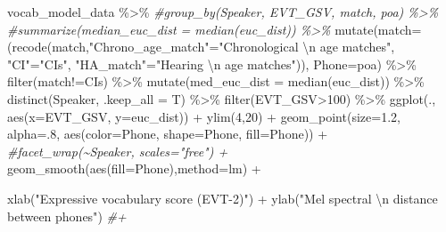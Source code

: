 \documentclass[
]{article}
\newenvironment{Shaded}{\begin{snugshade}}{\end{snugshade}}
\newcommand{\AttributeTok}[1]{\textcolor[rgb]{0.77,0.63,0.00}{#1}}
\newcommand{\CommentTok}[1]{\textcolor[rgb]{0.56,0.35,0.01}{\textit{#1}}}
\newcommand{\DecValTok}[1]{\textcolor[rgb]{0.00,0.00,0.81}{#1}}
\newcommand{\FloatTok}[1]{\textcolor[rgb]{0.00,0.00,0.81}{#1}}
\newcommand{\FunctionTok}[1]{\textcolor[rgb]{0.00,0.00,0.00}{#1}}
\newcommand{\NormalTok}[1]{#1}
\newcommand{\OtherTok}[1]{\textcolor[rgb]{0.56,0.35,0.01}{#1}}
\newcommand{\SpecialCharTok}[1]{\textcolor[rgb]{0.00,0.00,0.00}{#1}}
\newcommand{\StringTok}[1]{\textcolor[rgb]{0.31,0.60,0.02}{#1}}
\begin{document}
\begin{Shaded}
\begin{Highlighting}[]
\NormalTok{vocab\_model\_data }\SpecialCharTok{\%\textgreater{}\%}
  \CommentTok{\#group\_by(Speaker, EVT\_GSV, match, poa) \%\textgreater{}\%}
  \CommentTok{\#summarize(median\_euc\_dist = median(euc\_dist)) \%\textgreater{}\%}
  \FunctionTok{mutate}\NormalTok{(}\AttributeTok{match=}\NormalTok{(}\FunctionTok{recode}\NormalTok{(match,}\StringTok{"Chrono\_age\_match"}\OtherTok{=}\StringTok{"Chronological }\SpecialCharTok{\textbackslash{}n}\StringTok{ age matches"}\NormalTok{,}
                      \StringTok{"CI"}\OtherTok{=}\StringTok{"CIs"}\NormalTok{, }\StringTok{"HA\_match"}\OtherTok{=}\StringTok{"Hearing }\SpecialCharTok{\textbackslash{}n}\StringTok{ age matches"}\NormalTok{)),}
         \AttributeTok{Phone=}\NormalTok{poa) }\SpecialCharTok{\%\textgreater{}\%}
  \FunctionTok{filter}\NormalTok{(match}\SpecialCharTok{!=}\StringTok{\textquotesingle{}CIs\textquotesingle{}}\NormalTok{) }\SpecialCharTok{\%\textgreater{}\%}
  \FunctionTok{mutate}\NormalTok{(}\AttributeTok{med\_euc\_dist =} \FunctionTok{median}\NormalTok{(euc\_dist)) }\SpecialCharTok{\%\textgreater{}\%}
  \FunctionTok{distinct}\NormalTok{(Speaker, }\AttributeTok{.keep\_all =}\NormalTok{ T) }\SpecialCharTok{\%\textgreater{}\%}
  \FunctionTok{filter}\NormalTok{(EVT\_GSV}\SpecialCharTok{\textgreater{}}\DecValTok{100}\NormalTok{) }\SpecialCharTok{\%\textgreater{}\%}
  \FunctionTok{ggplot}\NormalTok{(., }\FunctionTok{aes}\NormalTok{(}\AttributeTok{x=}\NormalTok{EVT\_GSV, }\AttributeTok{y=}\NormalTok{euc\_dist)) }\SpecialCharTok{+} 
  \FunctionTok{ylim}\NormalTok{(}\DecValTok{4}\NormalTok{,}\DecValTok{20}\NormalTok{) }\SpecialCharTok{+}
  \FunctionTok{geom\_point}\NormalTok{(}\AttributeTok{size=}\FloatTok{1.2}\NormalTok{, }\AttributeTok{alpha=}\NormalTok{.}\DecValTok{8}\NormalTok{, }\FunctionTok{aes}\NormalTok{(}\AttributeTok{color=}\NormalTok{Phone, }\AttributeTok{shape=}\NormalTok{Phone, }\AttributeTok{fill=}\NormalTok{Phone)) }\SpecialCharTok{+} 
  \CommentTok{\#facet\_wrap(\textasciitilde{}Speaker, scales="free") +}
  \FunctionTok{geom\_smooth}\NormalTok{(}\FunctionTok{aes}\NormalTok{(}\AttributeTok{fill=}\NormalTok{Phone),}\AttributeTok{method=}\StringTok{\textquotesingle{}lm\textquotesingle{}}\NormalTok{) }\SpecialCharTok{+}

  \FunctionTok{xlab}\NormalTok{(}\StringTok{"Expressive vocabulary score (EVT{-}2)"}\NormalTok{) }\SpecialCharTok{+} 
  \FunctionTok{ylab}\NormalTok{(}\StringTok{"Mel spectral }\SpecialCharTok{\textbackslash{}n}\StringTok{ distance between phones"}\NormalTok{) }\CommentTok{\#+ }
\end{Highlighting}
\end{Shaded}
\end{document}
